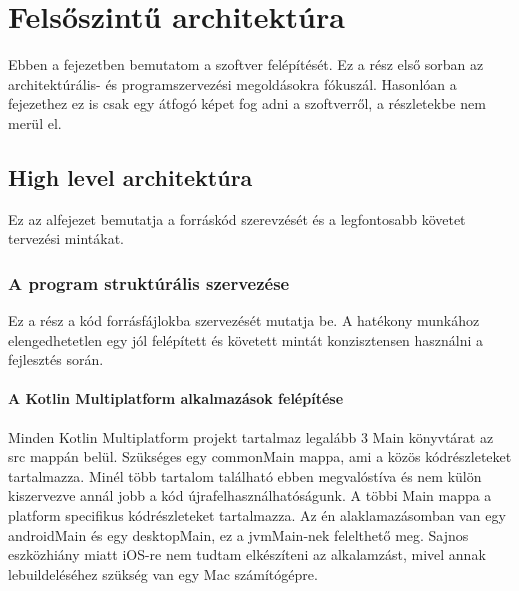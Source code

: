 \chapter{Felsőszintű architektúra}
\label{sec:Architecture}

Ebben a fejezetben bemutatom a szoftver felépítését.
Ez a rész első sorban az architektúrális- és programszervezési megoldásokra fókuszál.
Hasonlóan a  fejezethez ez is csak egy átfogó képet fog adni a szoftverről, a részletekbe nem merül el.


\section{High level architektúra}
\label{sec:HighLevelArchitecture}

Ez az alfejezet bemutatja a forráskód szerevzését és a legfontosabb követet tervezési mintákat.

\subsection{A program struktúrális szervezése}

Ez a rész a kód forrásfájlokba szervezését mutatja be.
A hatékony munkához elengedhetetlen egy jól felépített és követett mintát konzisztensen használni a fejlesztés során.

\subsubsection{A Kotlin Multiplatform alkalmazások felépítése}

Minden Kotlin Multiplatform projekt tartalmaz legalább 3 Main könyvtárat az src mappán belül.
Szükséges egy commonMain mappa, ami a közös kódrészleteket tartalmazza. Minél több tartalom található ebben megvalóstíva és nem külön kiszervezve annál jobb a kód újrafelhasználhatóságunk.
A többi Main mappa a platform specifikus kódrészleteket tartalmazza. Az én alaklamazásomban van egy androidMain és egy desktopMain, ez a jvmMain-nek felelthető meg.
Sajnos eszközhiány miatt iOS-re nem tudtam elkészíteni az alkalamzást, mivel annak lebuildeléséhez szükség van egy Mac számítógépre.

